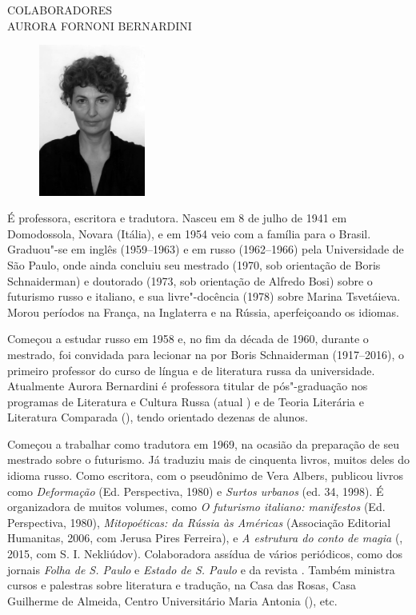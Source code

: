 \newpage
\MyriadPro
\label{autora}

\noindent{}COLABORADORES\\

\noindent{}AURORA FORNONI BERNARDINI


\begin{figure}
  \includegraphics[width=35mm]{./imgs/aurora.jpg}
 \end{figure}


É professora, escritora e tradutora. Nasceu em
8 de julho de 1941 em Domodossola, Novara (Itália), e em 1954 veio com a
família para o Brasil. Graduou"-se em inglês (1959--1963) e em russo
(1962--1966) pela Universidade de São Paulo, onde ainda concluiu seu
mestrado (1970, sob orientação de Boris Schnaiderman) e doutorado (1973,
sob orientação de Alfredo Bosi) sobre o futurismo russo e italiano, e
sua livre"-docência (1978) sobre Marina Tsvetáieva. Morou períodos na
França, na Inglaterra e na Rússia, aperfeiçoando os idiomas.

Começou a estudar russo em 1958 e, no fim da década de 1960, durante o
mestrado, foi convidada para lecionar na  por Boris Schnaiderman
(1917--2016), o primeiro professor do curso de língua e de literatura
russa da universidade. Atualmente Aurora Bernardini é professora titular
de pós"-graduação nos programas de Literatura e Cultura Russa (atual
) e de Teoria Literária e Literatura Comparada (), tendo
orientado dezenas de alunos.

Começou a trabalhar como tradutora em 1969, na ocasião da preparação de
seu mestrado sobre o futurismo. Já traduziu mais de cinquenta livros,
muitos deles do idioma russo. Como escritora, com o pseudônimo de Vera
Albers, publicou livros como \emph{Deformação} (Ed. Perspectiva, 1980) e
\emph{Surtos urbanos} (ed. 34, 1998). É organizadora de muitos volumes,
como \emph{O futurismo italiano: manifestos} (Ed. Perspectiva, 1980),
\emph{Mitopoéticas: da Rússia às Américas} (Associação Editorial
Humanitas, 2006, com Jerusa Pires Ferreira), e \emph{A estrutura do
conto de magia} (, 2015, com S. I. Nekliúdov). Colaboradora assídua
de vários periódicos, como dos jornais \emph{Folha de S. Paulo} e
\emph{Estado de S. Paulo} e da revista . Também ministra
cursos e palestras sobre literatura e tradução, na Casa das Rosas, Casa
Guilherme de Almeida, Centro Universitário Maria Antonia (), etc.

